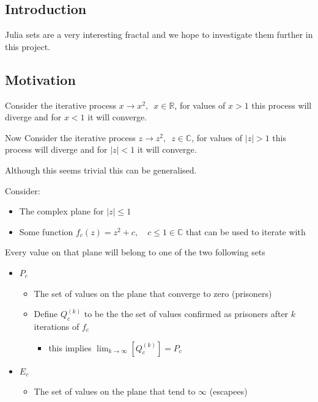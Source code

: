 \documentclass[11pt]{article}
\begin{document}
\subsection{Introduction}
\label{sec:org3e5875e}
Julia sets are a very interesting fractal and we hope to investigate them further in this project.
\subsection{Motivation}
\label{sec:orgdf1f3bb}
Consider the iterative process \(x \rightarrow x^{2}, \enspace x \in \mathbb{R}\),
for values of \(x>1\) this process will diverge and for \(x<1\) it will converge.

Now Consider the iterative process \(z \rightarrow z^{2}, \enspace z \in \mathbb{C}\),
for values of \(\left\lvert z \right\rvert >1\) this process will diverge and for \(\left\lvert z \right\rvert <1\) it will converge.

Although this seems trivial this can be generalised.

Consider:

\begin{itemize}
\item The complex plane for \(\left\lvert z \right\rvert \leq 1\)
\item Some function \(f_{c}(z) = z^{2} + c, \quad c \leq 1 \in \mathbb{C}\) that can be used to iterate with
\end{itemize}

Every value on that plane will belong to one of the two following sets

\begin{itemize}
\item \(P_{c}\)
\begin{itemize}
\item The set of values on the plane that converge to zero (prisoners)
\item Define \(Q^{(k)}_{c}\) to be the the set of values confirmed as prisoners after \(k\) iterations of \(f_{c}\)
\begin{itemize}
\item this implies \(\lim_{k \rightarrow \infty} \left[ Q^{(k)}_{c}  \right] = P_{c}\)
\end{itemize}
\end{itemize}
\item \(E_{c}\)
\begin{itemize}
\item The set of values on the plane that tend to \(\infty\) (escapees)
\end{itemize}
\end{itemize}
\end{document}
